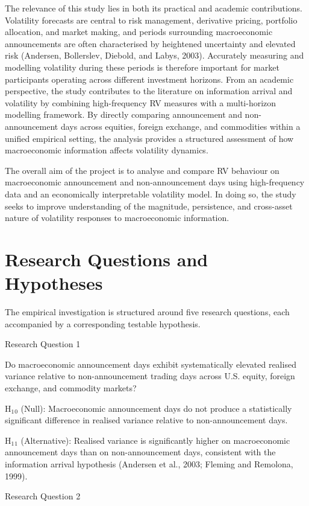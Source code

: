 \documentclass[12pt,a4paper]{report}
\begin{document}
The relevance of this study lies in both its practical and academic contributions. Volatility forecasts are central to risk management, derivative pricing, portfolio allocation, and market making, and periods surrounding macroeconomic announcements are often characterised by heightened uncertainty and elevated risk (Andersen, Bollerslev, Diebold, and Labys, 2003). Accurately measuring and modelling volatility during these periods is therefore important for market participants operating across different investment horizons. From an academic perspective, the study contributes to the literature on information arrival and volatility by combining high-frequency RV measures with a multi-horizon modelling framework. By directly comparing announcement and non-announcement days across equities, foreign exchange, and commodities within a unified empirical setting, the analysis provides a structured assessment of how macroeconomic information affects volatility dynamics.

The overall aim of the project is to analyse and compare RV behaviour on macroeconomic announcement and non-announcement days using high-frequency data and an economically interpretable volatility model. In doing so, the study seeks to improve understanding of the magnitude, persistence, and cross-asset nature of volatility responses to macroeconomic information.

\section{Research Questions and Hypotheses}
The empirical investigation is structured around five research questions, each accompanied by a corresponding testable hypothesis.

Research Question 1

Do macroeconomic announcement days exhibit systematically elevated realised variance relative to non-announcement trading days across U.S. equity, foreign exchange, and commodity markets?

H$_{1}$$_{0}$ (Null): Macroeconomic announcement days do not produce a statistically significant difference in realised variance relative to non-announcement days.

H$_{1}$$_{1}$ (Alternative): Realised variance is significantly higher on macroeconomic announcement days than on non-announcement days, consistent with the information arrival hypothesis (Andersen et al., 2003; Fleming and Remolona, 1999).

Research Question 2
\end{document}
